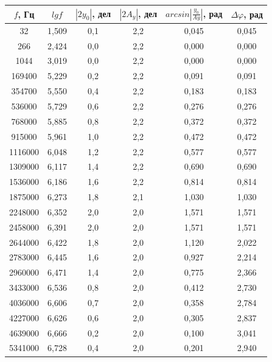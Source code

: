 \documentclass[a4paper,12pt]{article} %
\begin{document}
\begin{table}[!h]
\begin{tabular}{|c|c|c|c|c|c|}
\hline
$f$, Гц   & $lg f$  & $|2y_{0}|$, дел & $|2A_{y}|$, дел & $arcsin|\frac{y_{0}}{Ay}|$, рад & $\Delta\varphi$, рад \\ \hline
32   & 1,509 & 0,1        & 2,2        & 0,045              & 0,045         \\ \hline
266   & 2,424 & 0,0        & 2,2        & 0,000              & 0,000         \\ \hline
1044    & 3,019 & 0,0        & 2,2        & 0,000              & 0,000         \\ \hline
169400  & 5,229 & 0,2        & 2,2        & 0,091              & 0,091         \\ \hline
354700  & 5,550 & 0,4        & 2,2        & 0,183              & 0,183         \\ \hline
536000  & 5,729 & 0,6        & 2,2        & 0,276              & 0,276         \\ \hline
768000  & 5,885 & 0,8        & 2,2        & 0,372              & 0,372         \\ \hline
915000  & 5,961 & 1,0        & 2,2        & 0,472              & 0,472         \\ \hline
1116000 & 6,048 & 1,2        & 2,2        & 0,577              & 0,577         \\ \hline
1309000 & 6,117 & 1,4        & 2,2        & 0,690              & 0,690         \\ \hline
1536000 & 6,186 & 1,6        & 2,2        & 0,814              & 0,814         \\ \hline
1875000 & 6,273 & 1,8        & 2,1        & 1,030              & 1,030         \\ \hline
2248000 & 6,352 & 2,0        & 2,0        & 1,571              & 1,571         \\ \hline
2458000 & 6,391 & 2,0        & 2,0        & 1,571              & 1,571         \\ \hline
2644000 & 6,422 & 1,8        & 2,0        & 1,120              & 2,022         \\ \hline
2783000 & 6,445 & 1,6        & 2,0        & 0,927              & 2,214         \\ \hline
2960000 & 6,471 & 1,4        & 2,0        & 0,775              & 2,366         \\ \hline
3433000 & 6,536 & 0,8        & 2,0        & 0,412              & 2,730         \\ \hline
4036000 & 6,606 & 0,7        & 2,0        & 0,358              & 2,784         \\ \hline
4227000 & 6,626 & 0,6        & 2,0        & 0,305              & 2,837         \\ \hline
4639000 & 6,666 & 0,2        & 2,0        & 0,100              & 3,041         \\ \hline
5341000 & 6,728 & 0,4        & 2,0        & 0,201              & 2,940         \\ \hline
\end{tabular}
\end{table}
\end{document}
